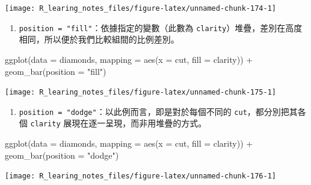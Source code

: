 \documentclass[
]{book}
\newenvironment{Shaded}{\begin{snugshade}}{\end{snugshade}}
\newcommand{\AttributeTok}[1]{\textcolor[rgb]{0.77,0.63,0.00}{#1}}
\newcommand{\FunctionTok}[1]{\textcolor[rgb]{0.00,0.00,0.00}{#1}}
\newcommand{\NormalTok}[1]{#1}
\newcommand{\SpecialCharTok}[1]{\textcolor[rgb]{0.00,0.00,0.00}{#1}}
\newcommand{\StringTok}[1]{\textcolor[rgb]{0.31,0.60,0.02}{#1}}
\providecommand{\tightlist}{%
  \setlength{\itemsep}{0pt}\setlength{\parskip}{0pt}}
\theoremstyle{definition}
\theoremstyle{remark}
\begin{document}
\begin{center}\texttt{[image: R\_learing\_notes\_files/figure-latex/unnamed-chunk-174-1]} \end{center}

\begin{enumerate}
\def\labelenumi{\arabic{enumi}.}
\setcounter{enumi}{1}
\tightlist
\item
  \texttt{position\ =\ "fill"}：依據指定的變數（此數為 \texttt{clarity}）堆疊，差別在高度相同，所以便於我們比較組間的比例差別。
\end{enumerate}

\begin{Shaded}
\begin{Highlighting}[]
\FunctionTok{ggplot}\NormalTok{(}\AttributeTok{data =}\NormalTok{ diamonds, }\AttributeTok{mapping =} \FunctionTok{aes}\NormalTok{(}\AttributeTok{x =}\NormalTok{ cut, }\AttributeTok{fill =}\NormalTok{ clarity)) }\SpecialCharTok{+}
  \FunctionTok{geom\_bar}\NormalTok{(}\AttributeTok{position =} \StringTok{"fill"}\NormalTok{)}
\end{Highlighting}
\end{Shaded}

\begin{center}\texttt{[image: R\_learing\_notes\_files/figure-latex/unnamed-chunk-175-1]} \end{center}

\begin{enumerate}
\def\labelenumi{\arabic{enumi}.}
\setcounter{enumi}{2}
\tightlist
\item
  \texttt{position\ =\ "dodge"}：以此例而言，即是對於每個不同的 \texttt{cut}，都分別把其各個 \texttt{clarity} 展現在逐一呈現，而非用堆疊的方式。
\end{enumerate}

\begin{Shaded}
\begin{Highlighting}[]
\FunctionTok{ggplot}\NormalTok{(}\AttributeTok{data =}\NormalTok{ diamonds, }\AttributeTok{mapping =} \FunctionTok{aes}\NormalTok{(}\AttributeTok{x =}\NormalTok{ cut, }\AttributeTok{fill =}\NormalTok{ clarity)) }\SpecialCharTok{+}
  \FunctionTok{geom\_bar}\NormalTok{(}\AttributeTok{position =} \StringTok{"dodge"}\NormalTok{)}
\end{Highlighting}
\end{Shaded}

\begin{center}\texttt{[image: R\_learing\_notes\_files/figure-latex/unnamed-chunk-176-1]} \end{center}
\end{document}
